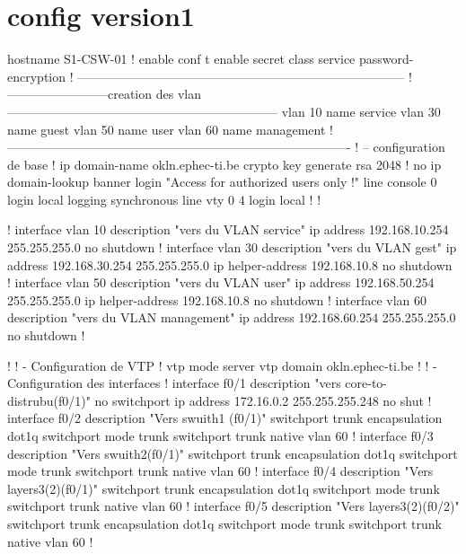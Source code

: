 \documentclass{article}
\begin{document}
{    \section{config version1}
    \scriptsize{}
    \begin{verbatimtab}[4]
hostname S1-CSW-01
!
enable
conf t
enable secret class 
service password-encryption
! ------------------------------------------------------------------------------
!------------------------creation des vlan-----------------------------------------------------------------
vlan 10 name service
vlan 30 name guest
vlan 50 name user
vlan 60 name management
!----------------------------------------------------------------------------------
! – configuration de base 
!
ip domain-name okln.ephec-ti.be
crypto key generate rsa
2048
!
no ip domain-lookup
banner login "Access for authorized users only !"
line console 0
  login local
  logging synchronous
line vty 0 4
  login local 
!
!

!
interface vlan 10
  description "vers du VLAN service"
  ip address 192.168.10.254 255.255.255.0
  no shutdown
!      
interface vlan 30
  description "vers du VLAN gest"
  ip address 192.168.30.254 255.255.255.0
  ip helper-address 192.168.10.8
  no shutdown
!
interface vlan 50
  description "vers du VLAN user"
  ip address 192.168.50.254 255.255.255.0
  ip helper-address 192.168.10.8
  no shutdown
!
interface vlan 60
  description "vers du VLAN management"
  ip address 192.168.60.254 255.255.255.0
  no shutdown
!

!
! - Configuration de VTP
!
vtp mode server
vtp domain okln.ephec-ti.be 
!
! - Configuration des interfaces
!       
interface f0/1
  description "vers core-to-distrubu(f0/1)"
  no switchport
  ip address 172.16.0.2 255.255.255.248
  no shut
!  
interface f0/2
  description "Vers swuith1 (f0/1)"
  switchport trunk encapsulation dot1q
  switchport mode trunk
  switchport trunk native vlan 60
!
interface f0/3
  description "Vers swuith2(f0/1)"
  switchport trunk encapsulation dot1q
  switchport mode trunk
  switchport trunk native vlan 60
!
interface f0/4
  description "Vers layers3(2)(f0/1)"
  switchport trunk encapsulation dot1q
  switchport mode trunk
  switchport trunk native vlan 60 
!
interface f0/5
  description "Vers layers3(2)(f0/2)"
  switchport trunk encapsulation dot1q
  switchport mode trunk
  switchport trunk native vlan 60 
!
 

\end{verbatimtab}}
\end{document}
